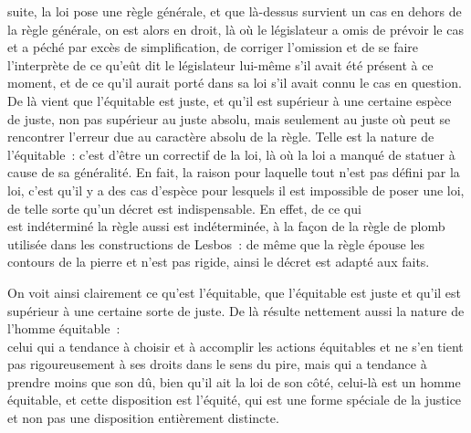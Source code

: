 \documentclass[french,twoside]{book} %
\begin{document}
suite, la loi pose une règle générale, et que là-dessus survient un cas en dehors de la règle générale, on est alors en droit, là où le législateur a omis de prévoir le cas et a péché par excès de simplification, de corriger l’omission et de se faire l’interprète de ce qu’eût dit le législateur lui-même s’il avait été présent à ce moment, et de ce qu’il aurait porté dans sa loi s’il avait connu le cas en question. De là vient que l’équitable est juste, et qu’il est supérieur à une certaine espèce de juste, non pas supérieur au juste absolu, mais seulement au juste où peut se \\
rencontrer l’erreur due au caractère absolu de la règle. Telle est la nature de l’équitable : c’est d’être un correctif de la loi, là où la loi a manqué de statuer à cause de sa généralité. En fait, la raison pour laquelle tout n’est pas défini par la loi, c’est qu’il y a des cas d’espèce pour lesquels il est impossible de poser une loi, de telle sorte qu’un décret est indispensable. En effet, de ce qui \\
est indéterminé la règle aussi est indéterminée, à la façon de la règle de plomb utilisée dans les constructions de Lesbos : de même que la règle épouse les contours de la pierre et n’est pas rigide, ainsi le décret est adapté aux faits.\par
On voit ainsi clairement ce qu’est l’équitable, que l’équitable est juste et qu’il est supérieur à une certaine sorte de juste. De là résulte nettement aussi la nature de l’homme équitable : \\
celui qui a tendance à choisir et à accomplir les actions équitables  et ne s’en tient pas rigoureusement à ses droits dans le sens du pire, mais qui a tendance à prendre moins que son dû, bien qu’il ait la loi de son côté, celui-là est un homme équitable, et cette disposition est l’équité, qui est une forme spéciale de la justice et non pas une disposition entièrement distincte.
\end{document}
